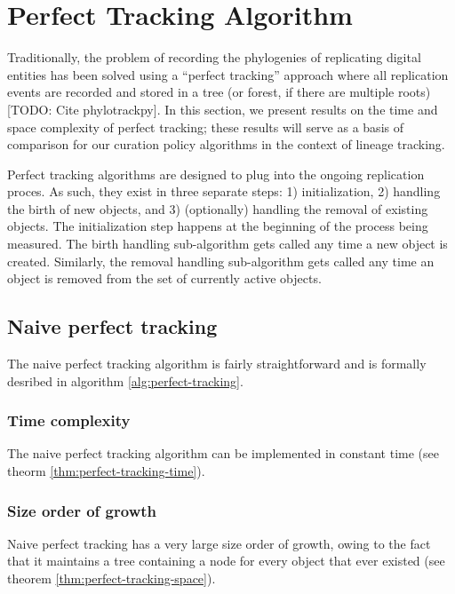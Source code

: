 \section{Perfect Tracking Algorithm} \label{sec:perfect-tracking}

Traditionally, the problem of recording the phylogenies of replicating digital 
entities has been solved using a ``perfect tracking'' approach where all replication 
events are recorded and stored in a tree (or forest, if there are multiple roots) [TODO: Cite phylotrackpy].
In this section, we present results on the time and space complexity of perfect tracking;
these results will serve as a basis of comparison for our curation policy algorithms in the context
of lineage tracking.

Perfect tracking algorithms are designed to plug into the ongoing replication proces.
As such, they exist in three separate steps: 1) initialization, 2) handling the birth of new objects, and 3) (optionally) handling the removal of existing objects.
The initialization step happens at the beginning of the process being measured.
The birth handling sub-algorithm gets called any time a new object is created.
Similarly, the removal handling sub-algorithm gets called any time an object is removed from the set of currently active objects.

\subsection{Naive perfect tracking}

The naive perfect tracking algorithm is fairly straightforward and is formally desribed in algorithm \ref{alg:perfect-tracking}. 



\subsubsection{Time complexity}

The naive perfect tracking algorithm can be implemented in constant time (see theorm \ref{thm:perfect-tracking-time}).



\subsubsection{Size order of growth}

Naive perfect tracking has a very large size order of growth, owing to the fact that it maintains a tree containing a node for every object that ever existed (see theorem \ref{thm:perfect-tracking-space}).


